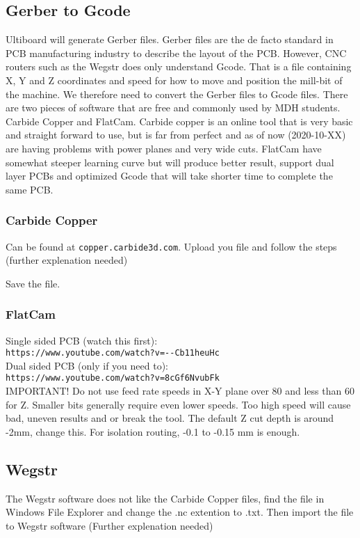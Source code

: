 \subsection{Gerber to Gcode}
Ultiboard will generate Gerber files. Gerber files are the de facto standard in PCB manufacturing industry to describe the layout of the PCB. However, CNC routers such as the Wegstr does only understand Gcode. That is a file containing X, Y and Z coordinates and speed for how to move and position the mill-bit of the machine. We therefore need to convert the Gerber files to Gcode files. There are two pieces of software that are free and commonly used by MDH students. Carbide Copper and FlatCam. Carbide copper is an online tool that is very basic and straight forward to use, but is far from perfect and as of now (2020-10-XX) are having problems with power planes and very wide cuts. FlatCam have somewhat steeper learning curve but will produce better result, support dual layer PCBs and optimized Gcode that will take shorter time to complete the same PCB.
\subsubsection{Carbide Copper}
Can be found at \verb|copper.carbide3d.com|.
Upload you file and follow the steps (further explenation needed)

Save the file.
\subsubsection{FlatCam}
Single sided PCB (watch this first):\\ \verb|https://www.youtube.com/watch?v=--Cb11heuHc|\\
Dual sided PCB (only if you need to):\\
\verb|https://www.youtube.com/watch?v=8cGf6NvubFk|\\
IMPORTANT! Do not use feed rate speeds in X-Y plane over 80 and less than 60 for Z. Smaller bits generally require even lower speeds. Too high speed will cause bad, uneven results and or break the tool. The default Z cut depth is around -2mm, change this. For isolation routing, -0.1 to -0.15 mm is enough.

\subsection{Wegstr}
The Wegstr software does not like the Carbide Copper files, find the file in Windows File Explorer and change the .nc extention to .txt. Then import the file to Wegstr software (Further explenation needed)


